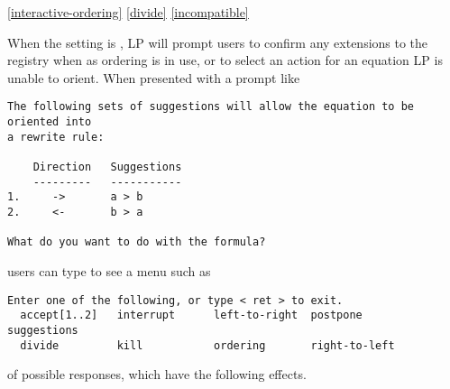 \ref{interactive-ordering}
\ref{divide}
\ref{incompatible}

When the  setting is , LP will prompt users
to confirm any extensions to the registry when as
 ordering is in use, or to select an action for
an equation LP is unable to orient.  When presented with a prompt like
\begin{verbatim}
The following sets of suggestions will allow the equation to be oriented into
a rewrite rule:

    Direction   Suggestions
    ---------   -----------
1.     ->       a > b
2.     <-       b > a

What do you want to do with the formula?
\end{verbatim}
users can type  to see a menu such as
\begin{verbatim}
Enter one of the following, or type < ret > to exit.
  accept[1..2]   interrupt      left-to-right  postpone       suggestions
  divide         kill           ordering       right-to-left
\end{verbatim}
of possible responses, which have the following effects.
